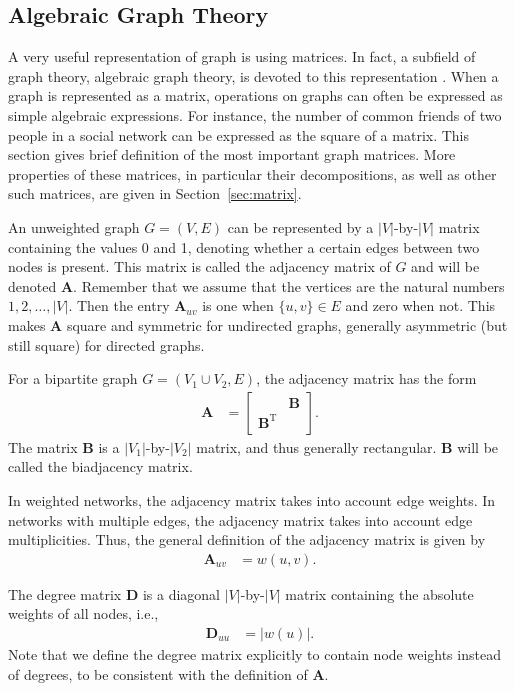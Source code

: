 \documentclass{article}
\begin{document}
\subsection{Algebraic Graph Theory}
A very useful representation of graph is using matrices. In fact, a
subfield of graph theory, algebraic graph theory, is devoted to
this representation \citep{b118,b646,b902}.  When a graph is represented as a
matrix, operations on graphs can often be expressed as simple algebraic
expressions.  For instance, the number of common friends of
two people in a social network can be expressed as the square of a
matrix. 
This section gives brief definition of the most important graph
matrices.  More properties of these matrices, in particular their
decompositions, as well as other such 
matrices, are given in Section~\ref{sec:matrix}. 

An unweighted graph $G=(V,E)$ can be represented by a $|V|$-by-$|V|$
matrix containing the values 0 and 1, denoting whether a certain edges
between two nodes is present.  This matrix is called the adjacency
matrix of $G$ and will be denoted $\mathbf A$.  Remember that we assume
that the vertices are the natural numbers $1, 2, \dotsc, |V|$.  Then the
entry $\mathbf A_{uv}$ is one when $\{u,v\} \in E$ and zero when not.
This makes $\mathbf A$ square and symmetric for undirected graphs, generally
asymmetric (but still square) for directed graphs.  

For a bipartite graph $G=(V_1 \cup V_2, E)$, the adjacency matrix has
the form 
\begin{align}
  \mathbf A &= \left[ \begin{array}{cc} & \mathbf B \\
      \mathbf B^{\mathrm T} & \end{array} \right].
\end{align}
The matrix $\mathbf B$ is a $|V_1|$-by-$|V_2|$ matrix, and thus
generally rectangular. $\mathbf B$ will be called the biadjacency
matrix. 

In weighted networks, the adjacency matrix takes into account edge
weights.  In networks with multiple edges, the adjacency matrix takes
into account edge multiplicities. Thus, the general definition of the
adjacency matrix is given by
\begin{align}
  \mathbf A_{uv} &= w(u, v). 
\end{align}

The degree matrix $\mathbf D$ is a diagonal $|V|$-by-$|V|$ matrix containing
the absolute weights of all nodes, i.e.,
\begin{align}
  \mathbf D_{uu} &= |w(u)|. 
\end{align}
Note that we define the degree matrix explicitly to contain node weights
instead of degrees, to be consistent with the definition of $\mathbf
A$. 
\end{document}
